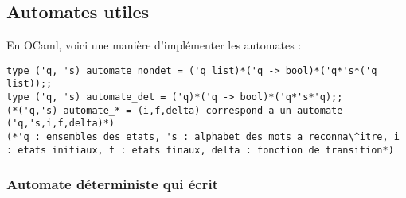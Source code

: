 \documentclass{article}
\theoremstyle{definition}
\begin{document}
\subsection{Automates utiles}
En OCaml, voici une manière d'implémenter les automates :

\begin{lstlisting}
type ('q, 's) automate_nondet = ('q list)*('q -> bool)*('q*'s*('q list));;
type ('q, 's) automate_det = ('q)*('q -> bool)*('q*'s*'q);;
(*('q,'s) automate_* = (i,f,delta) correspond a un automate ('q,'s,i,f,delta)*)
(*'q : ensembles des etats, 's : alphabet des mots a reconna\^itre, i : etats initiaux, f : etats finaux, delta : fonction de transition*)
\end{lstlisting}



\subsubsection{Automate déterministe qui écrit}
\end{document}
